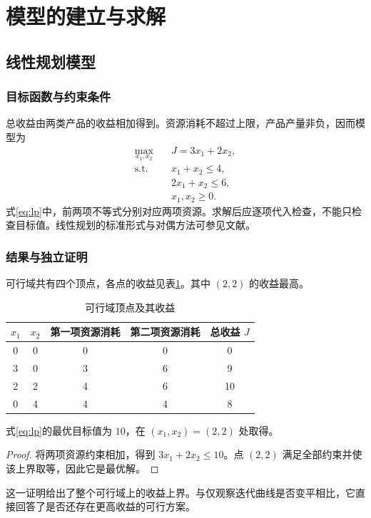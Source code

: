 \documentclass[UTF8,a4paper,zihao=-4,fontset=fandol]{ctexart}
\begin{document}
\section{模型的建立与求解}
\subsection{线性规划模型}
\subsubsection{目标函数与约束条件}
总收益由两类产品的收益相加得到。资源消耗不超过上限，产品产量非负，因而模型为
\begin{equation}
\begin{aligned}
\max_{x_1,x_2}\quad &J=3x_1+2x_2,\\
\text{s.t.}\quad &x_1+x_2\leq4,\\
&2x_1+x_2\leq6,\\
&x_1,x_2\geq0.
\end{aligned}
\label{eq:lp}
\end{equation}
式\eqref{eq:lp}中，前两项不等式分别对应两项资源。求解后应逐项代入检查，不能只检查目标值。线性规划的标准形式与对偶方法可参见文献\cite{bertsimas}。
\subsubsection{结果与独立证明}
可行域共有四个顶点，各点的收益见表\ref{tab:vertices}。其中 $(2,2)$ 的收益最高。
\begin{table}[htbp]
\centering
\caption{可行域顶点及其收益}
\label{tab:vertices}
\begin{tabular}{ccccc}
\toprule $x_1$ & $x_2$ & 第一项资源消耗 & 第二项资源消耗 & 总收益 $J$ \\ \midrule
0 & 0 & 0 & 0 & 0 \\
3 & 0 & 3 & 6 & 9 \\
2 & 2 & 4 & 6 & 10 \\
0 & 4 & 4 & 4 & 8 \\
\bottomrule
\end{tabular}
\end{table}
\begin{proposition}
式\eqref{eq:lp}的最优目标值为 $10$，在 $(x_1,x_2)=(2,2)$ 处取得。
\end{proposition}
\begin{proof}
将两项资源约束相加，得到 $3x_1+2x_2\leq10$。点 $(2,2)$ 满足全部约束并使该上界取等，因此它是最优解。
\end{proof}
这一证明给出了整个可行域上的收益上界。与仅观察迭代曲线是否变平相比，它直接回答了是否还存在更高收益的可行方案。
\end{document}
